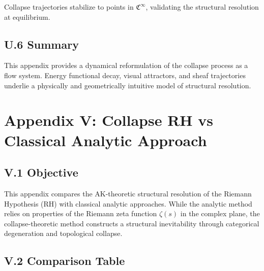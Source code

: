 \documentclass[11pt]{article}
\begin{document}
Collapse trajectories stabilize to points in \( \mathfrak{C}^\infty \), validating the structural resolution at equilibrium.

\subsection*{U.6 Summary}

This appendix provides a dynamical reformulation of the collapse process as a flow system. Energy functional decay, visual attractors, and sheaf trajectories underlie a physically and geometrically intuitive model of structural resolution.



\appendix
\section*{Appendix V: Collapse RH vs Classical Analytic Approach}

\subsection*{V.1 Objective}

This appendix compares the AK-theoretic structural resolution of the Riemann Hypothesis (RH) with classical analytic approaches. While the analytic method relies on properties of the Riemann zeta function \( \zeta(s) \) in the complex plane, the collapse-theoretic method constructs a structural inevitability through categorical degeneration and topological collapse.

\subsection*{V.2 Comparison Table}
\end{document}
